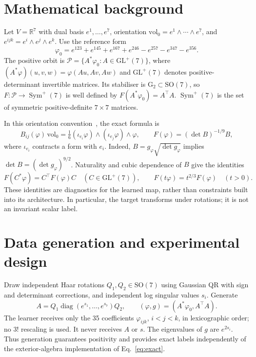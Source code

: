 \documentclass[a4paper,11pt]{article}
\newcommand{\R}{\mathbb{R}}
\newcommand{\Gtwo}{\mathrm{G}_2}
\newcommand{\SO}{\mathrm{SO}}
\newcommand{\GLp}{\mathrm{GL}^{+}}
\newcommand{\SPD}{\operatorname{Sym}^{+}}
\begin{document}
\section{Mathematical background}
Let $V=\R^7$ with dual basis $e^1,\ldots,e^7$, orientation
$\mathrm{vol}_0=e^1\wedge\cdots\wedge e^7$, and $e^{ijk}=e^i\wedge e^j\wedge e^k$.
Use the reference form
\begin{equation}
\varphi_0=e^{123}+e^{145}+e^{167}+e^{246}-e^{257}-e^{347}-e^{356}.
\end{equation}
The positive orbit is $\mathcal P=\{A^*\varphi_0:A\in\GLp(7)\}$, where
$(A^*\varphi)(u,v,w)=\varphi(Au,Av,Aw)$ and $\GLp(7)$ denotes positive-determinant
invertible matrices. Its stabiliser is $\Gtwo\subset\SO(7)$, so
$F:\mathcal P\to\SPD(7)$ is well defined by $F(A^*\varphi_0)=A^\top A$.
$\SPD(7)$ is the set of symmetric positive-definite $7\times7$ matrices.

In this orientation convention~\cite{grigorian}, the exact formula is
\begin{equation}\label{eq:exact}
B_{ij}(\varphi)\,\mathrm{vol}_0
=\tfrac16(\iota_{e_i}\varphi)\wedge(\iota_{e_j}\varphi)\wedge\varphi,
\qquad F(\varphi)=(\det B)^{-1/9}B,
\end{equation}
where $\iota_{e_i}$ contracts a form with $e_i$. Indeed,
$B=g_\varphi\sqrt{\det g_\varphi}$ implies $\det B=(\det g_\varphi)^{9/2}$.
Naturality and cubic dependence of $B$ give the identities
\begin{equation}\label{eq:identities}
F(C^*\varphi)=C^\top F(\varphi)C\quad(C\in\GLp(7)),\qquad
F(t\varphi)=t^{2/3}F(\varphi)\quad(t>0).
\end{equation}
These identities are diagnostics for the learned map, rather than constraints built
into its architecture. In particular, the target transforms under rotations; it is
not an invariant scalar label.

\newpage
\section{Data generation and experimental design}
Draw independent Haar rotations $Q_1,Q_2\in\SO(7)$ using Gaussian QR with sign and
determinant corrections, and independent log singular values $s_i$. Generate
\begin{equation}\label{eq:data}
A=Q_1\operatorname{diag}(e^{s_1},\ldots,e^{s_7})Q_2,
\qquad (\varphi,g)=(A^*\varphi_0,A^\top A).
\end{equation}
The learner receives only the 35 coefficients $\varphi_{ijk}$, $i<j<k$, in
lexicographic order; no $3!$ rescaling is used. It never receives $A$ or $s$.
The eigenvalues of $g$ are $e^{2s_i}$. Thus generation guarantees positivity and
provides exact labels independently of the exterior-algebra implementation of
Eq.~\eqref{eq:exact}.
\end{document}
